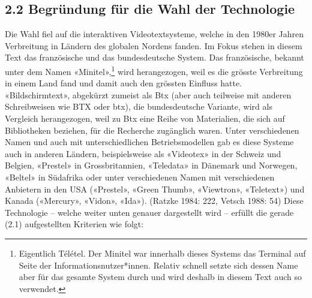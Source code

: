 \documentclass[a4paper,
fontsize=11pt,
oneside,
numbers=noperiodatend,
parskip=half-,
bibliography=totoc,
final
]{scrartcl}
\begin{document}
\hypertarget{begruxfcndung-fuxfcr-die-wahl-der-technologie}{%
\subsection{2.2 Begründung für die Wahl der
Technologie}\label{begruxfcndung-fuxfcr-die-wahl-der-technologie}}

Die Wahl fiel auf die interaktiven Videotextsysteme, welche in den
1980er Jahren Verbreitung in Ländern des globalen Nordens fanden. Im
Fokus stehen in diesem Text das französische und das bundesdeutsche
System. Das französische, bekannt unter dem Namen «Minitel»,\footnote{Eigentlich
  Télétel. Der Minitel war innerhalb dieses Systems das Terminal auf
  Seite der Informationsnutzer*innen. Relativ schnell setzte sich dessen
  Name aber für das gesamte System durch und wird deshalb in diesem Text
  auch so verwendet.} wird herangezogen, weil es die grösste Verbreitung
in einem Land fand und damit auch den grössten Einfluss hatte.
«Bildschirmtext», abgekürzt zumeist als Btx (aber auch teilweise mit
anderen Schreibweisen wie BTX oder btx), die bundesdeutsche Variante,
wird als Vergleich herangezogen, weil zu Btx eine Reihe von Materialien,
die sich auf Bibliotheken beziehen, für die Recherche zugänglich waren.
Unter verschiedenen Namen und auch mit unterschiedlichen
Betriebsmodellen gab es diese Systeme auch in anderen Ländern,
beispielsweise als «Videotex» in der Schweiz und Belgien, «Prestel» in
Grossbritannien, «Teledata» in Dänemark und Norwegen, «Beltel» in
Südafrika oder unter verschiedenen Namen mit verschiedenen Anbietern in
den USA («Prestel», «Green Thumb», «Viewtron», «Teletext») und Kanada
(«Mercury», «Vidon», «Ida»). (Ratzke 1984: 222, Vetsch 1988: 54) Diese
Technologie -- welche weiter unten genauer dargestellt wird -- erfüllt
die gerade (2.1) aufgestellten Kriterien wie folgt:
\end{document}

